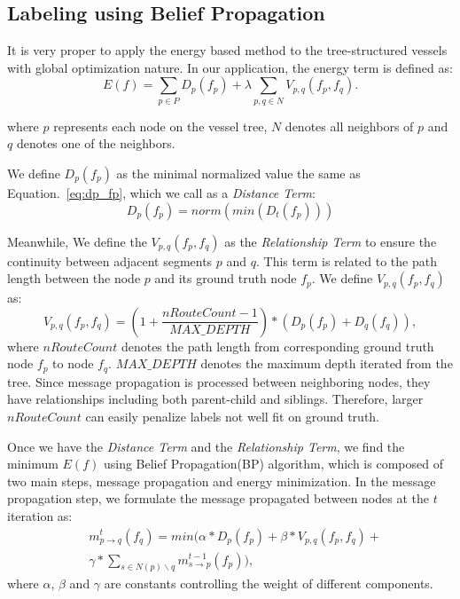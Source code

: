 \documentclass[journal]{IEEEtran}
\begin{document}
\subsection{Labeling using Belief Propagation}
\label{subsec:labeling-using-bp}
It is very proper to apply the energy based method to the tree-structured vessels with global optimization nature. In our application, the energy term is defined as:
\begin{equation}
E(f) = \sum_{p\in P} D_{p}(f_{p}) + \lambda \sum_{p,q \in N} V_{p,q}(f_{p}, f_{q}).
\end{equation}

where $p$ represents each node on the vessel tree, $N$ denotes all neighbors of $p$ and $q$ denotes one of the neighbors. 

We define $D_{p}(f_{p})$ as the minimal normalized value the same as Equation.~\ref{eq:dp_fp}, which we call as a \textit{Distance Term}:
\begin{equation}
D_{p}(f_{p}) = norm(min(D_{t}(f_{p})))
\end{equation}

Meanwhile, We define the $V_{p,q}(f_{p}, f_{q})$ as the \textit{Relationship Term} to ensure the continuity between adjacent segments $p$ and $q$. This term is related to the path length between the node $p$ and its ground truth node $f_{p}$. We define $V_{p,q}(f_{p}, f_{q})$ as:
\begin{equation}
V_{p,q}(f_{p}, f_{q}) = (1+\frac{nRouteCount-1}{MAX\_DEPTH})*(D_{p}(f_{p}) + D_{q}(f_{q})), 
\end{equation}
where $nRouteCount$ denotes the path length from corresponding ground truth node $f_{p}$ to node $f_{q}$.  $MAX\_DEPTH$ denotes the maximum depth iterated from the tree. Since message propagation is processed between neighboring nodes, they have relationships including both parent-child and siblings. Therefore, larger $nRouteCount$ can easily penalize labels not well fit on ground truth. 

Once we have the \textit{Distance Term} and the \textit{Relationship Term}, we find the minimum $E(f)$ using Belief Propagation(BP) algorithm, which is composed of two main steps, message propagation and energy minimization. In the message propagation step, we formulate the message propagated between nodes at the $t$ iteration as:
\begin{equation}
\begin{split}
&m_{p \to q}^{t}(f_{q}) = min(\alpha*D_p(f_{p}) + \beta*V_{p,q}(f_{p},f_{q}) + \\
&\gamma*\sum_{s \in N(p)\backslash q}{m_{s \to p}^{t-1}(f_{p})}),
\end{split}
\end{equation}
where $\alpha$, $\beta$ and $\gamma$ are constants controlling the weight of different components.
\end{document}
